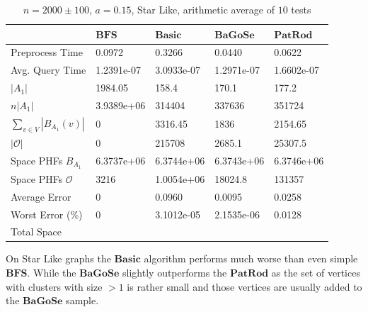\documentclass[shortabstract, lic, english]{iithesis}
\theoremstyle{definition} \newtheorem{definition}{Definition}[chapter]
\theoremstyle{plain} \newtheorem{remark}[definition]{Observation}
\theoremstyle{plain} \newtheorem{theorem}[definition]{Theorem}
\theoremstyle{plain} \newtheorem{lemma}[definition]{Lemma}
\theoremstyle{plain} \newtheorem{conjecture}[definition]{Conjecture}
\begin{document}
\begin{table}[H]
    \centering
    \begin{tabular}{ |p{3cm}||p{2cm}|p{2cm}|p{2cm}|p{2cm}|  } 
        \hline
        & $\mathbf{BFS}$ & $\mathbf{Basic}$ & $\mathbf{BaGoSe}$ & $\mathbf{PatRod}$ \\
        \hline
        \hline
        Preprocess Time                 & 0.0972     & 0.3266     & 0.0440      & 0.0622     \\
        \hline
        Avg. Query Time                 & 1.2391e-07 & 3.0933e-07 & 1.2971e-07  & 1.6602e-07 \\
        \hline
        $|A_1|$                         & 1984.05    & 158.4      & 170.1       & 177.2      \\
        \hline
        $n  |A_1|$                     & 3.9389e+06 & 314404     & 337636      & 351724     \\
        \hline
        $\sum_{v \in V} |B_{A_1}(v)| $  & 0          & 3316.45    & 1836        & 2154.65    \\
        \hline
        $|\mathcal{O}|$                 & 0          & 215708     & 2685.1      & 25307.5    \\
        \hline
        Space PHFs $B_{A_1}$            & 6.3737e+06 & 6.3744e+06 & 6.3743e+06  & 6.3746e+06 \\
        \hline
        Space PHFs $\mathcal{O}$        & 3216       & 1.0054e+06 & 18024.8     & 131357     \\
        \hline
        Average Error                   & 0          & 0.0960     & 0.0095      & 0.0258     \\
        \hline
        Worst Error (\%)                & 0          & 3.1012e-05 & 2.1535e-06  & 0.0128     \\
        \hline
        Total Space                     &            &            &             &            \\
        \hline

    \end{tabular}
    \caption{$n = 2000 \pm 100$, $a = 0.15$, Star Like, arithmetic average of $10$ tests}
\end{table}

On Star Like graphs the $\mathbf{Basic}$ algorithm performs much worse than even simple $\mathbf{BFS}$.
While the $\mathbf{BaGoSe}$ slightly outperforms the $\mathbf{PatRod}$ as the set of vertices with clusters with size $>1$
is rather small and those vertices are usually added to the $\mathbf{BaGoSe}$ sample.
\end{document}
